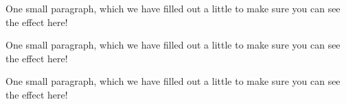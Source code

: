 \documentclass{article}
\begin{document}
	One small paragraph, which we have filled out a little to make sure you can
	see the effect here!
	
	One small paragraph, which we have filled out a little to make sure you can
	see the effect here!
	
	\noindent  One small paragraph, which we have filled out a little to make sure
	you can see the effect here!
\end{document}
